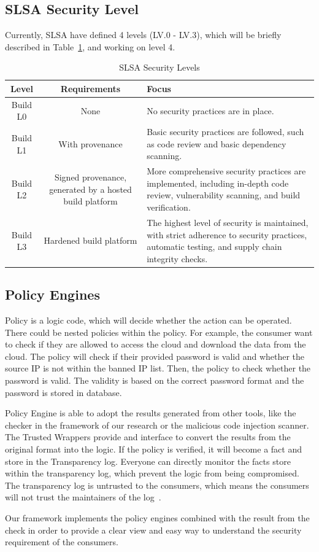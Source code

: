 \subsection{SLSA Security Level}
Currently, SLSA have defined 4 levels (LV.0 - LV.3), which will be 
briefly described in Table~\ref{tab:slsa-levels}, and working on level 4.
\begin{table}[ht]
  \centering
  \caption{SLSA Security Levels}
  \label{tab:slsa-levels}
  \begin{tabular}{|c|c|p{6cm}|}
  \hline
  \textbf{Level} & \textbf{Requirements} & \textbf{Focus} \\
  \hline
  Build L0 & None & No security practices are in place. \\
  \hline
  Build L1 & With provenance & Basic security practices are followed, such as code review and basic dependency scanning. \\
  \hline
  Build L2 & Signed provenance, generated by a hosted build platform & More comprehensive security practices are implemented, including in-depth code review, vulnerability scanning, and build verification. \\
  \hline
  Build L3 & Hardened build platform & The highest level of security is maintained, with strict adherence to security practices, automatic testing, and supply chain integrity checks. \\
  \hline
  \end{tabular}
\end{table}

\subsection{Policy Engines}
Policy is a logic code, which will decide whether the action can be operated. There could be
nested policies within the policy. For example, the consumer want to check if they are allowed
to access the cloud and download the data from the cloud. The policy will check if their provided password
is valid and whether the source IP is not within the banned IP list. Then, the policy to check whether
the password is valid. The validity is based on the correct password format and the password is stored in database.

Policy Engine is able to adopt the results generated from other tools, like the checker in the framework of 
our research or the malicious code injection scanner. The Trusted Wrappers provide and interface to 
convert the results from the original format into the logic. If the policy is verified, it will become 
a fact and store in the Transparency log. Everyone can directly monitor the facts store within the transparency 
log, which prevent the logic from being compromised. The transparency log is untrusted to the consumers,
which means the consumers will not trust the maintainers of the log~\cite{ferraiuolo2022policy}.

Our framework implements the policy engines combined with the result from the check in order to provide a clear 
view and easy way to understand the security requirement of the consumers.


